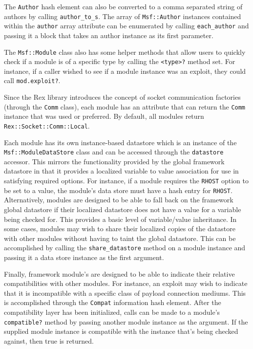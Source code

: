 \documentclass{report}
\begin{document}
\par
The \texttt{Author} hash element can also be converted to a comma
separated string of authors by calling \texttt{author\_to\_s}.  The
array of \texttt{Msf::Author} instances contained within the
\texttt{author} array attribute can be enumerated by calling
\texttt{each\_author} and passing it a block that takes an author
instance as its first parameter.

\par
The \texttt{Msf::Module} class also has some helper methods that
allow users to quickly check if a module is of a specific type by
calling the \texttt{<type>?} method set.  For instance, if a caller
wished to see if a module instance was an exploit, they could call
\texttt{mod.exploit?}.

\par
Since the Rex library introduces the concept of socket communication
factories (through the \texttt{Comm} class), each module has an
attribute that can return the \texttt{Comm} instance that was used
or preferred.  By default, all modules return
\texttt{Rex::Socket::Comm::Local}.

\par
Each module has its own instance-based datastore which is an
instance of the \texttt{Msf::ModuleDataStore} class and can be
accessed through the \texttt{datastore} accessor. This mirrors the
functionality provided by the global framework datastore in that it
provides a localized variable to value association for use in
satisfying required options.  For instance, if a module requires the
\texttt{RHOST} option to be set to a value, the module's data store
must have a hash entry for \texttt{RHOST}. Alternatively, modules
are designed to be able to fall back on the framework global
datastore if their localized datastore does not have a value for a
variable being checked for. This provides a basic level of
variable/value inheritance.  In some cases, modules may wish to
share their localized copies of the datastore with other modules
without having to taint the global datastore.  This can be
accomplished by calling the \texttt{share\_datastore} method on a
module instance and passing it a data store instance as the first
argument.

\par
Finally, framework module's are designed to be able to indicate
their relative compatibilities with other modules.  For instance, an
exploit may wish to indicate that it is incompatible with a specific
class of payload connection mediums.  This is accomplished through
the \texttt{Compat} information hash element.  After the
compatibility layer has been initialized, calls can be made to a
module's \texttt{compatible?} method by passing another module
instance as the argument.  If the supplied module instance is
compatible with the instance that's being checked against, then true
is returned.
\end{document}
